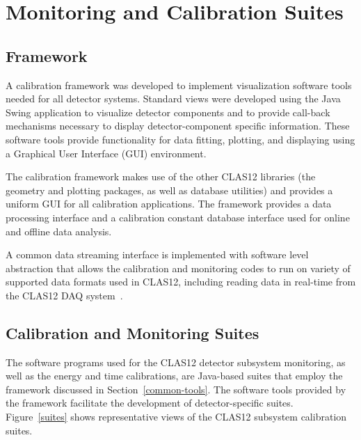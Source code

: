 \section{Monitoring and Calibration Suites}
\label{sec:calibration}

\subsection{Framework}

A calibration framework was developed to implement visualization software tools needed for all detector
systems. Standard views were developed using the Java Swing application to visualize detector components and
to provide call-back mechanisms necessary to display detector-component specific information.  These software
tools provide functionality for data fitting, plotting, and displaying using a Graphical User Interface (GUI)
environment.

The calibration framework makes use of the other CLAS12 libraries (the geometry and plotting packages, as well
as database utilities) and provides a uniform GUI for all calibration applications. The framework provides a data
processing interface and a calibration constant database interface used for online and offline data analysis.

A common data streaming interface is implemented with software level abstraction that allows the calibration and
monitoring codes to run on variety of supported data formats used in CLAS12, including reading data in real-time
from the CLAS12 DAQ system~\cite{daq-nim}.

\subsection{Calibration and Monitoring Suites}

The software programs used for the CLAS12 detector subsystem monitoring, as well as the energy and time
calibrations,  are Java-based suites that employ the framework discussed in Section~\ref{common-tools}. The
software tools provided by the framework facilitate the development of detector-specific suites.
Figure~\ref{suites} shows representative views of the CLAS12 subsystem calibration suites.

